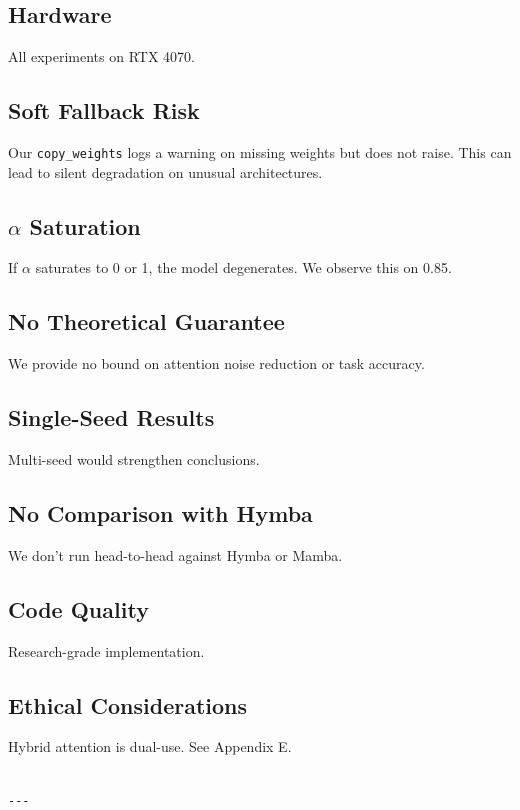 \subsection{Hardware}

All experiments on RTX 4070.

\subsection{Soft Fallback Risk}

Our \texttt{copy\_weights} logs a warning on missing weights but does not raise. This 
can lead to silent degradation on unusual architectures.

\subsection{$\alpha$ Saturation}

If $\alpha$ saturates to 0 or 1, the model degenerates. We observe this on 
0.85.

\subsection{No Theoretical Guarantee}

We provide no bound on attention noise reduction or task accuracy.

\subsection{Single-Seed Results}

Multi-seed would strengthen conclusions.

\subsection{No Comparison with Hymba}

We don't run head-to-head against Hymba or Mamba.

\subsection{Code Quality}

Research-grade implementation.

\subsection{Ethical Considerations}

Hybrid attention is dual-use. See Appendix E.
\begin{lstlisting}

---
\end{lstlisting}